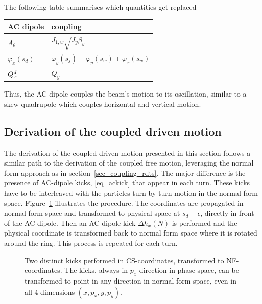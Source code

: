 %
The following table summarises which quantities get replaced
\begin{center}
\begin{tabular}{ll}
    AC dipole & coupling \\
    \hline
    \hline
    $ A_\theta $        & $ J_{1,w}\sqrt{J_y\beta_y}$ \\
    $ \varphi_x(s_d) $  & $ \varphi_y(s_j) - \varphi_y(s_w) \mp \varphi_x(s_w)$ \\
    $ Q^{d}_{x} $          & $ Q_y $\\
    \hline
\end{tabular}
\end{center}
Thus, the AC dipole couples the beam's motion to its oscillation, similar to a skew quadrupole which couples
horizontal and vertical motion.

\subsection{Derivation of the coupled driven motion}

The derivation of the coupled driven motion presented in this section follows a similar path to the derivation of the 
coupled free motion, leveraging the normal form approach as in section~\ref{sec_coupling_rdts}.
The major difference is the presence of AC-dipole kicks, \eqref{eq_ackick} that appear in each turn.
These kicks have to be interleaved with the particles turn-by-turn motion in the normal form space.
Figure~\ref{fig_sketch_drv_ac} illustrates the procedure. The coordinates are propagated in normal form
space and transformed to physical space at $s_d-\epsilon$, directly in front of the AC-dipole. Then
an AC-dipole kick $\Delta h_x(N)$ is performed and the physical coordinate is transformed back to
normal form space where it is rotated around the ring. This process is repeated for each turn.

\begin{figure}
  \centering
  
  \hspace{1.0em}
  
      \caption{Two distinct kicks performed in CS-coordinates, transformed to NF-coordinates.
      The kicks, always in $p_x$ direction in phase space, can be transformed to point in any direction
      in normal form space, even in all 4 dimensions $(x, p_x, y, p_y) $.
      }
  \label{fig_sketch_drv_ac}
\end{figure}

